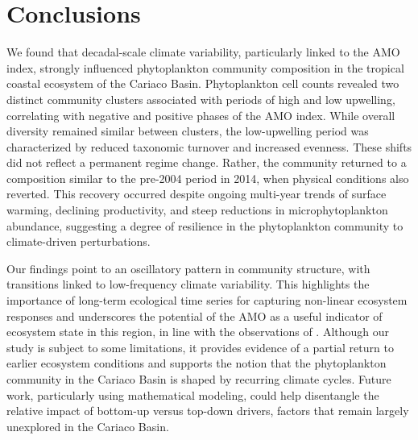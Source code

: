 \documentclass[draft]{agujournal2019}
\begin{document}
    

\section{Conclusions}
    We found that decadal-scale climate variability, particularly linked to the AMO index, strongly influenced phytoplankton community composition in the tropical coastal ecosystem of the Cariaco Basin. Phytoplankton cell counts revealed two distinct community clusters associated with periods of high and low upwelling, correlating with negative and positive phases of the AMO index. While overall diversity remained similar between clusters, the low-upwelling period was characterized by reduced taxonomic turnover and increased evenness. These shifts did not reflect a permanent regime change. Rather, the community returned to a composition similar to the pre-2004 period in 2014, when physical conditions also reverted. This recovery occurred despite ongoing multi-year trends of surface warming, declining productivity, and steep reductions in microphytoplankton abundance, suggesting a degree of resilience in the phytoplankton community to climate-driven perturbations.

    Our findings point to an oscillatory pattern in community structure, with transitions linked to low-frequency climate variability. This highlights the importance of long-term ecological time series for capturing non-linear ecosystem responses and underscores the potential of the AMO as a useful indicator of ecosystem state in this region, in line with the observations of . Although our study is subject to some limitations, it provides evidence of a partial return to earlier ecosystem conditions and supports the notion that the phytoplankton community in the Cariaco Basin is shaped by recurring climate cycles. Future work, particularly using mathematical modeling, could help disentangle the relative impact of bottom-up versus top-down drivers, factors that remain largely unexplored in the Cariaco Basin.
 





%
%
\end{document}
